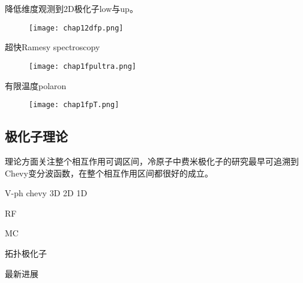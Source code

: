降低维度观测到2D极化子low与up\cite{koschorreck2012attractive}。
\begin{figure}[!htbp]
    \centering
    \texttt{[image: chap12dfp.png]}
    \label{2dfp}
\end{figure}

超快Ramesy spectroscopy
\begin{figure}[!htbp]
    \centering
    \texttt{[image: chap1fpultra.png]}
    \label{fpultra}
\end{figure}

有限温度polaron
\begin{figure}[!htbp]
    \centering
    \texttt{[image: chap1fpT.png]}
    \label{fpT}
\end{figure}




\subsection{极化子理论}
理论方面关注整个相互作用可调区间，冷原子中费米极化子的研究最早可追溯到Chevy变分波函数，在整个相互作用区间都很好的成立。


V-ph
chevy
3D
2D
1D

RF

MC

拓扑极化子

最新进展















